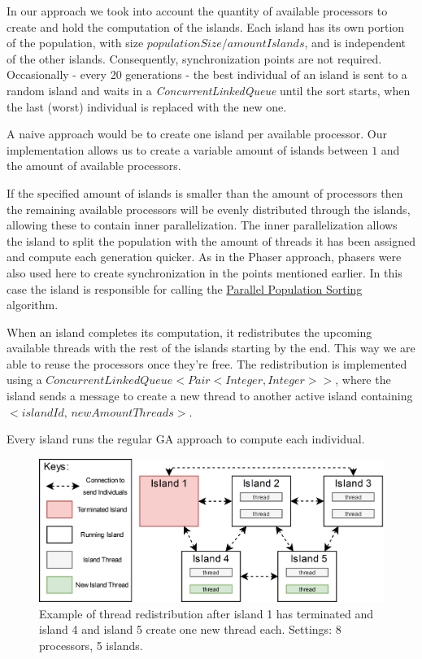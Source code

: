 \documentclass[runningheads]{llncs}
\begin{document}
In our approach we took into account the quantity of available processors to create and hold the computation of the islands. Each island has its own portion of the population, with size  \(populationSize / amountIslands \), and is independent of the other islands. Consequently, synchronization points are not required. Occasionally - every 20 generations - the best individual of an island is sent to a random island and waits in a \emph{ConcurrentLinkedQueue} until the sort starts, when the last (worst) individual is replaced with the new one.

A naive approach would be to create one island per available processor. Our implementation allows us to create a variable amount of islands between $1$ and the amount of available processors.

 If the specified amount of islands is smaller than the amount of processors then the remaining available processors will be evenly distributed through the islands, allowing these to contain inner parallelization. The inner parallelization allows the island to split the population with the amount of threads it has been assigned and compute each generation quicker. As in the Phaser approach, phasers were also used here to create synchronization in the points mentioned earlier. In this case the island is responsible for calling the \hyperref[subsubsec:parallelSort]{Parallel Population Sorting} algorithm.

When an island completes its computation, it redistributes the upcoming available threads with the rest of the islands starting by the end. This way we are able to reuse the processors once they're free. The redistribution is implemented using a \(ConcurrentLinkedQueue<Pair<Integer, Integer>>\), where the island sends a message to create a new thread to another active island containing \(<islandId, \,newAmountThreads>\).

Every island runs the regular GA approach to compute each individual.

\begin{figure}[htbp]
\centering
\includegraphics[width=.92\textwidth]{IslandModel.png}
\caption{Example of thread redistribution after island 1 has terminated and island 4 and island 5 create one new thread each. Settings: 8 processors, 5 islands.} \label{islandDiagram}
\end{figure}
\end{document}
